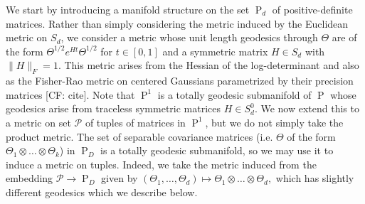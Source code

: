 \documentclass{article}
\newcommand{\ot}{\otimes}
\newcommand\PD{\operatorname{P}}
\newcommand\smallSym{S}
\newcommand\SPD{\mathcal{P}}
\newcommand{\CF}[1]{{\color{purple}[CF: #1]}}
\begin{document}
We start by introducing a manifold structure on the set $\PD_d$ of positive-definite matrices. Rather than simply considering the metric induced by the Euclidean metric on $\smallSym_d$, we consider a metric whose unit length geodesics through $\Theta$ are of the form $\Theta^{1/2} e^{Ht} \Theta^{1/2}$ for $t \in [0,1]$ and a symmetric matrix $H \in \smallSym_d$ with $\|H\|_F = 1$. This metric arises from the Hessian of the log-determinant \cite{bhatia2009positive} and also as the Fisher-Rao metric on centered Gaussians parametrized by their precision matrices \CF{cite}. Note that $\PD^1$ is a totally geodesic submanifold of $\PD$ whose geodesics arise from traceless symmetric matrices $H \in \smallSym_d^0$. We now extend this to a metric on set $\SPD$ of tuples of matrices in $\PD^1$, but we do not simply take the product metric. The set of separable covariance matrices (i.e. $\Theta$ of the form $\Theta_1 \ot \dots \ot \Theta_k$) in $\PD_D$ is a totally geodesic submanifold, so we may use it to induce a metric on tuples. Indeed, we take the metric induced from the embedding $\SPD \to \PD_D$ given by $(\Theta_1, \dots, \Theta_d) \mapsto \Theta_1 \ot \dots \ot \Theta_d,$ which has slightly different geodesics which we describe below.




\end{document}
